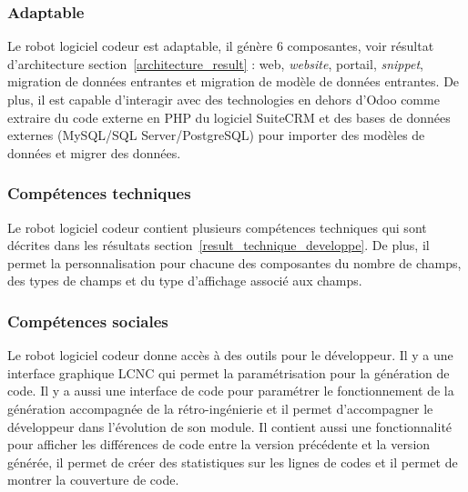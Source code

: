\subsubsection{Adaptable}
Le robot logiciel codeur est adaptable, il génère 6 composantes, voir résultat d'architecture section~\ref{architecture_result} : web, \textit{website}, portail, \textit{snippet}, migration de données entrantes et migration de modèle de données entrantes. De plus, il est capable d'interagir avec des technologies en dehors d'Odoo comme extraire du code externe en PHP du logiciel SuiteCRM et des bases de données externes (MySQL/SQL Server/PostgreSQL) pour importer des modèles de données et migrer des données.


\subsubsection{Compétences techniques}
Le robot logiciel codeur contient plusieurs compétences techniques qui sont décrites dans les résultats section~\ref{result_technique_developpe}. De plus, il permet la personnalisation pour chacune des composantes du nombre de champs, des types de champs et du type d'affichage associé aux champs.


\subsubsection{Compétences sociales}
Le robot logiciel codeur donne accès à des outils pour le développeur. Il y a une interface graphique LCNC qui permet la paramétrisation pour la génération de code. Il y a aussi une interface de code pour paramétrer le fonctionnement de la génération accompagnée de la rétro-ingénierie et il permet d'accompagner le développeur dans l'évolution de son module. Il contient aussi une fonctionnalité pour afficher les différences de code entre la version précédente et la version générée, il permet de créer des statistiques sur les lignes de codes et il permet de montrer la couverture de code.




